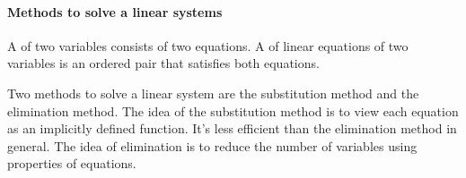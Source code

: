 

\paragraph*{Methods to solve a linear systems}

	A  of two variables consists of two equations.  A  of linear equations of two variables is an ordered pair that satisfies both equations.

	Two methods to solve a linear system are the substitution method and the elimination method. The idea of the substitution method is to view each equation as an implicitly defined function. It's less efficient than the elimination method in general. The idea of elimination is to reduce the number of variables using properties of equations.

